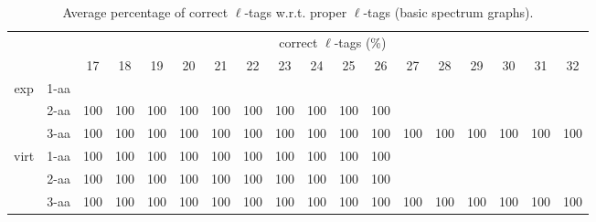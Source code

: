 \documentclass{article}
\begin{document}
\begin{table}[h]\tiny
\vspace{3mm}
{\centering
\begin{center}
\begin{tabular}{|c|l|c|c|c|c|c|c|c|c|c|c|c|c|c|c|c|c|}
  \hline
  \multicolumn{2}{|c|}{ } & \multicolumn{ 16 }{|c|}{ correct $\ell$-tags (\%)} \\
  \cline{3- 18}
  \multicolumn{2}{|c|}{ }  & 17 & 18 & 19 & 20 & 21 & 22 & 23 & 24 & 25 & 26 & 27 & 28 & 29 & 30 & 31 & 32\\
  \hline
  \multirow{3}{*}{exp}
&  1-aa  &  &  &  &  &  &  &  &  &  &  &  &  &  &  &  & \\&  2-aa  & 100 & 100 & 100 & 100 & 100 & 100 & 100 & 100 & 100 & 100 &  &  &  &  &  & \\&  3-aa  & 100 & 100 & 100 & 100 & 100 & 100 & 100 & 100 & 100 & 100 & 100 & 100 & 100 & 100 & 100 & 100\\ \hline
  \multirow{3}{*}{virt} 
&  1-aa  & 100 & 100 & 100 & 100 & 100 & 100 & 100 & 100 & 100 & 100 &  &  &  &  &  & \\&  2-aa  & 100 & 100 & 100 & 100 & 100 & 100 & 100 & 100 & 100 & 100 &  &  &  &  &  & \\&  3-aa  & 100 & 100 & 100 & 100 & 100 & 100 & 100 & 100 & 100 & 100 & 100 & 100 & 100 & 100 & 100 & 100\\ \hline
\end{tabular}
\end{center}
\par}
\centering
\caption{ Average percentage of correct $\ell$-tags w.r.t. proper $\ell$-tags (basic spectrum graphs).}
\vspace{3mm}
\label{table:table3}
\end{table}
\end{document}
